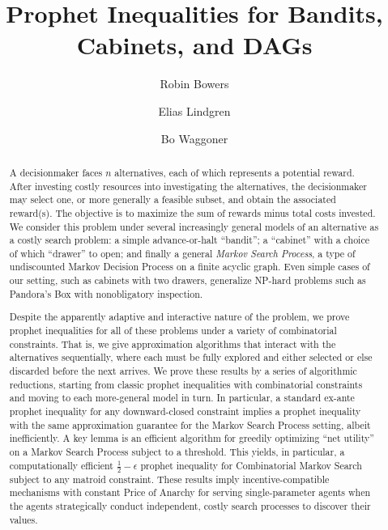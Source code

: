 \documentclass{article}
\begin{document}
\begin{titlepage}

\title{Prophet Inequalities for Bandits, Cabinets, and DAGs}

\author{Robin Bowers}
\author{Elias Lindgren}
\author{Bo Waggoner}
\date{}

\maketitle

\begin{abstract}
  A decisionmaker faces $n$ alternatives, each of which represents a potential reward.
  After investing costly resources into investigating the alternatives, the decisionmaker may select one, or more generally a feasible subset, and obtain the associated reward(s).
  The objective is to maximize the sum of rewards minus total costs invested.
  We consider this problem under several increasingly general models of an alternative as a costly search problem: a simple advance-or-halt ``bandit''; a ``cabinet'' with a choice of which ``drawer'' to open; and finally a general \emph{Markov Search Process}, a type of undiscounted Markov Decision Process on a finite acyclic graph.
  Even simple cases of our setting, such as cabinets with two drawers, generalize NP-hard problems such as Pandora's Box with nonobligatory inspection.

  Despite the apparently adaptive and interactive nature of the problem, we prove prophet inequalities for all of these problems under a variety of combinatorial constraints.
  That is, we give approximation algorithms that interact with the alternatives sequentially, where each must be fully explored and either selected or else discarded before the next arrives.
  We prove these results by a series of algorithmic reductions, starting from classic prophet inequalities with combinatorial constraints and moving to each more-general model in turn.
  In particular, a standard ex-ante prophet inequality for any downward-closed constraint implies a prophet inequality with the same approximation guarantee for the Markov Search Process setting, albeit inefficiently.
  A key lemma is an efficient algorithm for greedily optimizing ``net utility'' on a Markov Search Process subject to a threshold.
  This yields, in particular, a computationally efficient $\frac{1}{2}-\epsilon$ prophet inequality for Combinatorial Markov Search subject to any matroid constraint.
  These results imply incentive-compatible mechanisms with constant Price of Anarchy for serving single-parameter agents when the agents strategically conduct independent, costly search processes to discover their values.
\end{abstract}



\end{titlepage}
\end{document}
